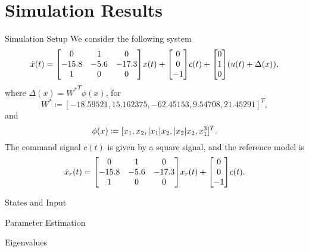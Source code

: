 \documentclass[]{beamer}
\theoremstyle{plain}
\theoremstyle{definition}
\theoremstyle{remark}
\begin{document}
\section{Simulation Results}

\begin{frame}{Simulation Setup}
	We consider the following system
	\begin{equation*}
		\dot{x}(t) = \mqty[0 & 1 & 0 \\ -15.8 & -5.6 & -17.3 \\ 1 & 0 & 0] x(t) +
		\mqty[0 \\ 0 \\ -1] c(t) + \mqty[0 \\ 1 \\ 0] \qty(u(t) + \Delta(x)),
	\end{equation*}
	where $\Delta(x) = {W^\ast}^T \phi(x)$, for
	\begin{equation*}
		W^\ast \coloneqq [-18.59521, 15.162375, -62.45153, 9.54708, 21.45291]^T,
	\end{equation*}
	and
	\begin{equation*}
		\phi(x) \coloneqq [x_1, x_2, \abs{x_1} x_2, \abs{x_2} x_2, x_1^3]^T.
	\end{equation*}
	The command signal $c(t)$ is given by a square signal, and the reference
	model is
	\begin{equation*}
		\dot{x}_r(t) = \mqty[0 & 1 & 0 \\ -15.8 & -5.6 & -17.3 \\ 1 & 0 & 0]
		x_r(t) + \mqty[0 \\ 0 \\ -1] c(t).
	\end{equation*}
\end{frame}

\begin{frame}{States and Input}
\end{frame}

\begin{frame}{Parameter Estimation}
\end{frame}

\begin{frame}{Eigenvalues}
\end{frame}
\end{document}
